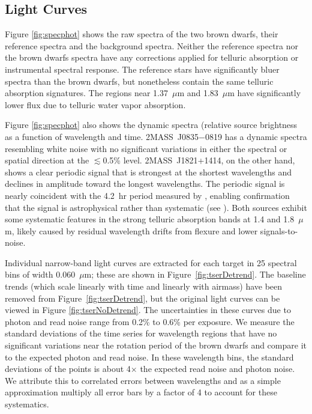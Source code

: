 \documentclass[twocolumn]{aastex6}
\newcommand{\sha}{2MASS~J0835$-$0819}
\newcommand{\shb}{2MASS~J1821+1414}
\begin{document}
\subsection{Light Curves}

Figure \ref{fig:specphot} shows the raw spectra of the two brown dwarfs, their reference spectra and the background spectra.
Neither the reference spectra nor the brown dwarfs spectra have any corrections applied for telluric absorption or instrumental spectral response.
The reference stars have significantly bluer spectra than the brown dwarfs, but nonetheless contain the same telluric absorption signatures.
The regions near 1.37~$\mu$m and 1.83~$\mu$m have significantly lower flux due to telluric water vapor absorption.

Figure \ref{fig:specphot} also shows the dynamic spectra (relative source brightness as a function of wavelength and time.
{\sha} has a dynamic spectra resembling white noise with no significant variations in either the spectral or spatial direction at the $\lesssim$0.5\% level.
{\shb}, on the other hand, shows a clear periodic signal that is strongest at the shortest wavelengths and declines in amplitude toward the longest wavelengths. The periodic signal is nearly coincident with the 4.2~hr period measured by \citet{2015ApJ...799..154M}, enabling confirmation that the signal is astrophysical rather than systematic (see \citealt{2016ApJ...826..156S}).
Both sources exhibit some systematic features in the strong telluric absorption bands at 1.4 and 1.8~$\mu$m, likely caused by residual wavelength drifts from flexure and lower signals-to-noise.

Individual narrow-band light curves are extracted for each target in 25 spectral bins of width 0.060~$\mu$m; these are shown in Figure~\ref{fig:tserDetrend}.
The baseline trends (which scale linearly with time and linearly with airmass) have been removed from Figure~\ref{fig:tserDetrend}, but the original light curves can be viewed in Figure \ref{fig:tserNoDetrend}.
The uncertainties in these curves due to photon and read noise range from 0.2\% to 0.6\% per exposure.
We measure the standard deviations of the time series for wavelength regions that have no significant variations near the rotation period of the brown dwarfs and compare it to the expected photon and read noise.
In these wavelength bins, the standard deviations of the points is about 4$\times$ the expected read noise and photon noise.
We attribute this to correlated errors between wavelengths and as a simple approximation multiply all error bars by a factor of 4 to account for these systematics.
\end{document}
